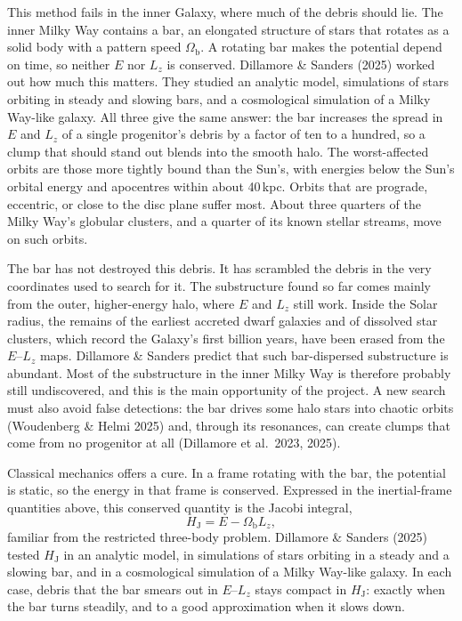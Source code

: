 \documentclass[11pt,a4paper]{article}
\begin{document}
This method fails in the inner Galaxy, where much of the debris should lie. The inner Milky Way contains a bar, an elongated structure of stars that rotates as a solid body with a pattern speed $\Omega_\mathrm{b}$. A rotating bar makes the potential depend on time, so neither $E$ nor $L_z$ is conserved. Dillamore \& Sanders (2025) worked out how much this matters. They studied an analytic model, simulations of stars orbiting in steady and slowing bars, and a cosmological simulation of a Milky Way-like galaxy. All three give the same answer: the bar increases the spread in $E$ and $L_z$ of a single progenitor's debris by a factor of ten to a hundred, so a clump that should stand out blends into the smooth halo. The worst-affected orbits are those more tightly bound than the Sun's, with energies below the Sun's orbital energy and apocentres within about 40\,kpc. Orbits that are prograde, eccentric, or close to the disc plane suffer most. About three quarters of the Milky Way's globular clusters, and a quarter of its known stellar streams, move on such orbits.

The bar has not destroyed this debris. It has scrambled the debris in the very coordinates used to search for it. The substructure found so far comes mainly from the outer, higher-energy halo, where $E$ and $L_z$ still work. Inside the Solar radius, the remains of the earliest accreted dwarf galaxies and of dissolved star clusters, which record the Galaxy's first billion years, have been erased from the $E$--$L_z$ maps. Dillamore \& Sanders predict that such bar-dispersed substructure is abundant. Most of the substructure in the inner Milky Way is therefore probably still undiscovered, and this is the main opportunity of the project. A new search must also avoid false detections: the bar drives some halo stars into chaotic orbits (Woudenberg \& Helmi 2025) and, through its resonances, can create clumps that come from no progenitor at all (Dillamore et al.\ 2023, 2025).

Classical mechanics offers a cure. In a frame rotating with the bar, the potential is static, so the energy in that frame is conserved. Expressed in the inertial-frame quantities above, this conserved quantity is the Jacobi integral,
\begin{equation}
H_\mathrm{J} = E - \Omega_\mathrm{b} L_z ,
\end{equation}
familiar from the restricted three-body problem. Dillamore \& Sanders (2025) tested $H_\mathrm{J}$ in an analytic model, in simulations of stars orbiting in a steady and a slowing bar, and in a cosmological simulation of a Milky Way-like galaxy. In each case, debris that the bar smears out in $E$--$L_z$ stays compact in $H_\mathrm{J}$: exactly when the bar turns steadily, and to a good approximation when it slows down.
\end{document}
